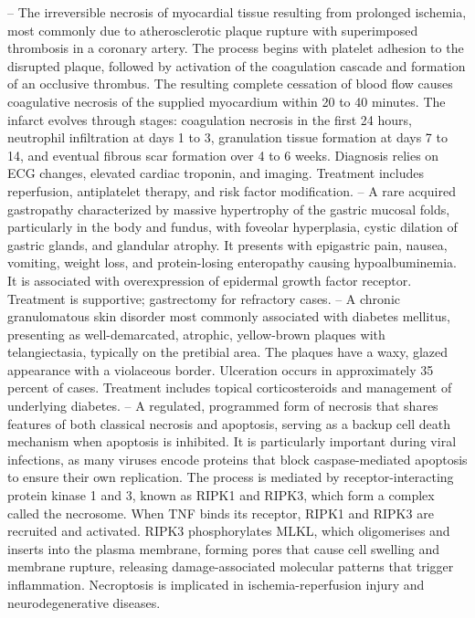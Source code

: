 -- The irreversible necrosis of myocardial tissue resulting from prolonged ischemia, most commonly due to atherosclerotic plaque rupture with superimposed thrombosis in a coronary artery. The process begins with platelet adhesion to the disrupted plaque, followed by activation of the coagulation cascade and formation of an occlusive thrombus. The resulting complete cessation of blood flow causes coagulative necrosis of the supplied myocardium within 20 to 40 minutes. The infarct evolves through stages: coagulation necrosis in the first 24 hours, neutrophil infiltration at days 1 to 3, granulation tissue formation at days 7 to 14, and eventual fibrous scar formation over 4 to 6 weeks. Diagnosis relies on ECG changes, elevated cardiac troponin, and imaging. Treatment includes reperfusion, antiplatelet therapy, and risk factor modification.
-- A rare acquired gastropathy characterized by massive hypertrophy of the gastric mucosal folds, particularly in the body and fundus, with foveolar hyperplasia, cystic dilation of gastric glands, and glandular atrophy. It presents with epigastric pain, nausea, vomiting, weight loss, and protein-losing enteropathy causing hypoalbuminemia. It is associated with overexpression of epidermal growth factor receptor. Treatment is supportive; gastrectomy for refractory cases.
-- A chronic granulomatous skin disorder most commonly associated with diabetes mellitus, presenting as well-demarcated, atrophic, yellow-brown plaques with telangiectasia, typically on the pretibial area. The plaques have a waxy, glazed appearance with a violaceous border. Ulceration occurs in approximately 35 percent of cases. Treatment includes topical corticosteroids and management of underlying diabetes.
-- A regulated, programmed form of necrosis that shares features of both classical necrosis and apoptosis, serving as a backup cell death mechanism when apoptosis is inhibited. It is particularly important during viral infections, as many viruses encode proteins that block caspase-mediated apoptosis to ensure their own replication. The process is mediated by receptor-interacting protein kinase 1 and 3, known as RIPK1 and RIPK3, which form a complex called the necrosome. When TNF binds its receptor, RIPK1 and RIPK3 are recruited and activated. RIPK3 phosphorylates MLKL, which oligomerises and inserts into the plasma membrane, forming pores that cause cell swelling and membrane rupture, releasing damage-associated molecular patterns that trigger inflammation. Necroptosis is implicated in ischemia-reperfusion injury and neurodegenerative diseases.
